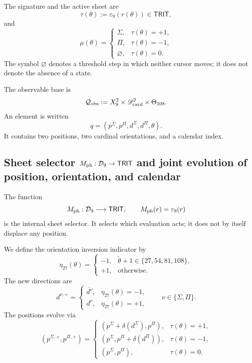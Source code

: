 {The signature and the active sheet are
\[
 \tau(\theta):=\varepsilon_9(r(\theta))\in\mathsf{TRIT},
\]
and
\[
 \mu(\theta)=
 \begin{cases}
  \Sigma,&\tau(\theta)=+1,\\
  \Pi,&\tau(\theta)=-1,\\
  \varnothing,&\tau(\theta)=0.
 \end{cases}
\]
The symbol \(\varnothing\) denotes a threshold step in which neither cursor
moves; it does not denote the absence of a state.

\begin{definition}
\label{p12-83-c1-s3:def:tpk-configuracion-observable}
The observable base is
\[
 \mathcal Q_{\rm obs}
 :=X_9^2\times\mathscr D_{\rm card}^2\times\Theta_{108}.
\]
An element is written
\[
 q=(p^\Sigma,p^\Pi,d^\Sigma,d^\Pi,\theta).
\]
It contains two positions, two cardinal orientations, and a calendar index.
\end{definition}

\subsection{Sheet selector \(M_{\rm ph}:\mathcal D_9\to\mathsf{TRIT}\) and joint evolution of position, orientation, and calendar}

The function
\[
 M_{\rm ph}:\mathcal D_9\longrightarrow\mathsf{TRIT},
 \qquad M_{\rm ph}(r)=\varepsilon_9(r)
\]
is the internal sheet selector. It selects which evaluation acts; it does not by itself
displace any position.

We define the orientation inversion indicator by
\[
 \eta_{27}(\theta)=
 \begin{cases}
  -1,&\widetilde\theta+1\in\{27,54,81,108\},\\
  +1,&\text{otherwise}.
 \end{cases}
\]
The new directions are
\[
 d^{\nu,+}=
 \begin{cases}
  \overline{d^\nu},&\eta_{27}(\theta)=-1,\\
  d^\nu,&\eta_{27}(\theta)=+1,
 \end{cases}
 \qquad \nu\in\{\Sigma,\Pi\}.
\]
The positions evolve via
\[
 (p^{\Sigma,+},p^{\Pi,+})=
 \begin{cases}
 (p^\Sigma+\delta(d^\Sigma),p^\Pi),&\tau(\theta)=+1,\\
 (p^\Sigma,p^\Pi+\delta(d^\Pi)),&\tau(\theta)=-1,\\
 (p^\Sigma,p^\Pi),&\tau(\theta)=0.
 \end{cases}
\]

}
